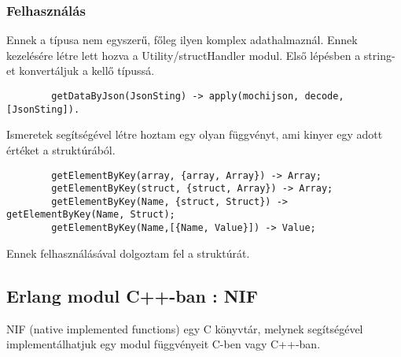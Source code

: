 	\subsubsection{Felhasználás}
	Ennek a típusa nem egyszerű, főleg ilyen komplex adathalmaznál. Ennek kezelésére létre lett hozva a Utility/structHandler modul. \newline 
	Első lépésben a string-et konvertáljuk a kellő típussá. 
	\begin{verbatim}
		getDataByJson(JsonSting) -> apply(mochijson, decode, [JsonSting]).
	\end{verbatim}
	Ismeretek segítségével létre hoztam egy olyan függvényt, ami kinyer egy adott értéket a struktúrából.
	\begin{verbatim}
		getElementByKey(array, {array, Array}) -> Array;
		getElementByKey(struct, {struct, Array}) -> Array;
		getElementByKey(Name, {struct, Struct}) -> getElementByKey(Name, Struct);
		getElementByKey(Name,[{Name, Value}]) -> Value;
	\end{verbatim}
	Ennek felhasználásával dolgoztam fel a struktúrát.

\subsection{Erlang modul C++-ban : NIF}
	NIF \cite{erl_nif} (native implemented functions) egy C könyvtár, melynek segítségével implementálhatjuk egy modul függvényeit C-ben vagy C++-ban. 

